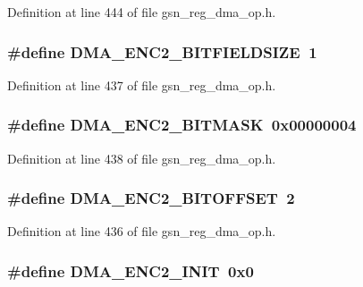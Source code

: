 Definition at line 444 of file gsn\_\-reg\_\-dma\_\-op.h.

\hypertarget{a00547_aae284ba10854d4b9d0c4b4bc01fc54e2}{
\subsubsection[{DMA\_\-ENC2\_\-BITFIELDSIZE}]{\setlength{\rightskip}{0pt plus 5cm}\#define DMA\_\-ENC2\_\-BITFIELDSIZE~1}}
\label{a00547_aae284ba10854d4b9d0c4b4bc01fc54e2}


Definition at line 437 of file gsn\_\-reg\_\-dma\_\-op.h.

\hypertarget{a00547_a80c48492165f72c698d4131cc8dd6bcc}{
\subsubsection[{DMA\_\-ENC2\_\-BITMASK}]{\setlength{\rightskip}{0pt plus 5cm}\#define DMA\_\-ENC2\_\-BITMASK~0x00000004}}
\label{a00547_a80c48492165f72c698d4131cc8dd6bcc}


Definition at line 438 of file gsn\_\-reg\_\-dma\_\-op.h.

\hypertarget{a00547_a42e056fab0b0a89352bced5ac3d33fdd}{
\subsubsection[{DMA\_\-ENC2\_\-BITOFFSET}]{\setlength{\rightskip}{0pt plus 5cm}\#define DMA\_\-ENC2\_\-BITOFFSET~2}}
\label{a00547_a42e056fab0b0a89352bced5ac3d33fdd}


Definition at line 436 of file gsn\_\-reg\_\-dma\_\-op.h.

\hypertarget{a00547_a90af2a70e5bbcfb5e4bbc7b25a958f78}{
\subsubsection[{DMA\_\-ENC2\_\-INIT}]{\setlength{\rightskip}{0pt plus 5cm}\#define DMA\_\-ENC2\_\-INIT~0x0}}
\label{a00547_a90af2a70e5bbcfb5e4bbc7b25a958f78}


